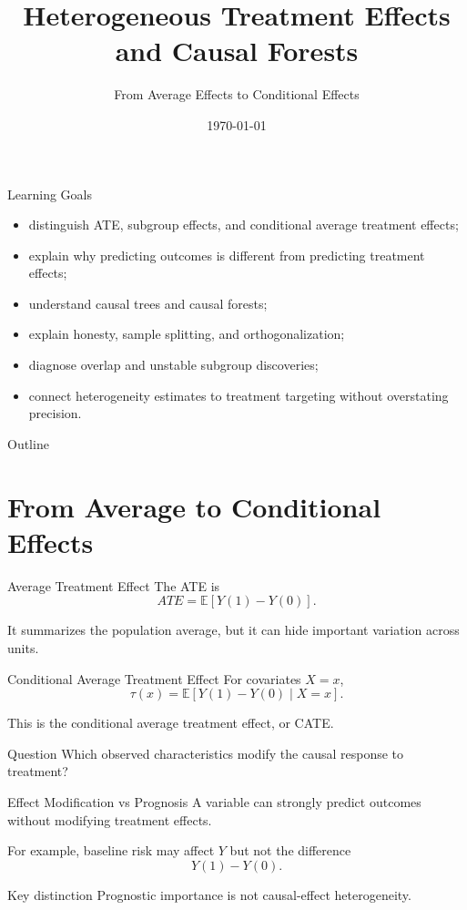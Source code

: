 \documentclass[aspectratio=169,11pt]{beamer}
\title[HTE and Causal Forests]{Heterogeneous Treatment Effects and Causal Forests}
\subtitle{From Average Effects to Conditional Effects}
\date{\today}
\newcommand{\E}{\mathbb{E}}
\begin{document}
\begin{frame}
\titlepage
\end{frame}

\begin{frame}{Learning Goals}
\begin{itemize}
\item distinguish ATE, subgroup effects, and conditional average treatment effects;
\item explain why predicting outcomes is different from predicting treatment effects;
\item understand causal trees and causal forests;
\item explain honesty, sample splitting, and orthogonalization;
\item diagnose overlap and unstable subgroup discoveries;
\item connect heterogeneity estimates to treatment targeting without overstating precision.
\end{itemize}
\end{frame}

\begin{frame}{Outline}
\tableofcontents
\end{frame}

\section{From Average to Conditional Effects}

\begin{frame}{Average Treatment Effect}
The ATE is
\[
ATE=\E[Y(1)-Y(0)].
\]

It summarizes the population average, but it can hide important variation across units.
\end{frame}

\begin{frame}{Conditional Average Treatment Effect}
For covariates \(X=x\),
\[
\tau(x)=\E[Y(1)-Y(0)\mid X=x].
\]

This is the conditional average treatment effect, or CATE.

\begin{block}{Question}
Which observed characteristics modify the causal response to treatment?
\end{block}
\end{frame}

\begin{frame}{Effect Modification vs Prognosis}
A variable can strongly predict outcomes without modifying treatment effects.

For example, baseline risk may affect \(Y\) but not the difference
\[
Y(1)-Y(0).
\]

\begin{alertblock}{Key distinction}
Prognostic importance is not causal-effect heterogeneity.
\end{alertblock}
\end{frame}
\end{document}
